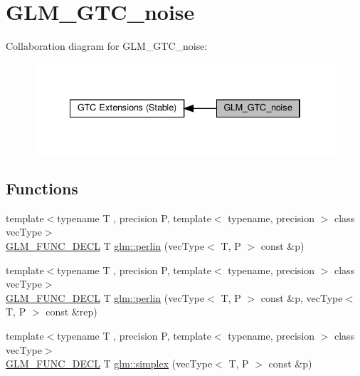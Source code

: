 \hypertarget{group__gtc__noise}{}\section{G\+L\+M\+\_\+\+G\+T\+C\+\_\+noise}
\label{group__gtc__noise}
Collaboration diagram for G\+L\+M\+\_\+\+G\+T\+C\+\_\+noise\+:\nopagebreak
\begin{figure}[H]
\begin{center}
\leavevmode
\includegraphics[width=334pt]{group__gtc__noise}
\end{center}
\end{figure}
\subsection*{Functions}
\begin{DoxyCompactItemize}
\item 
{\footnotesize template$<$typename T , precision P, template$<$ typename, precision $>$ class vec\+Type$>$ }\\\hyperlink{setup_8hpp_ab2d052de21a70539923e9bcbf6e83a51}{G\+L\+M\+\_\+\+F\+U\+N\+C\+\_\+\+D\+E\+CL} T \hyperlink{group__gtc__noise_ga14e5975486b2b36e747861d3c65b16c1}{glm\+::perlin} (vec\+Type$<$ T, P $>$ const \&p)
\item 
{\footnotesize template$<$typename T , precision P, template$<$ typename, precision $>$ class vec\+Type$>$ }\\\hyperlink{setup_8hpp_ab2d052de21a70539923e9bcbf6e83a51}{G\+L\+M\+\_\+\+F\+U\+N\+C\+\_\+\+D\+E\+CL} T \hyperlink{group__gtc__noise_ga7e103ffffacb322fe2d4863c372ae2fd}{glm\+::perlin} (vec\+Type$<$ T, P $>$ const \&p, vec\+Type$<$ T, P $>$ const \&rep)
\item 
{\footnotesize template$<$typename T , precision P, template$<$ typename, precision $>$ class vec\+Type$>$ }\\\hyperlink{setup_8hpp_ab2d052de21a70539923e9bcbf6e83a51}{G\+L\+M\+\_\+\+F\+U\+N\+C\+\_\+\+D\+E\+CL} T \hyperlink{group__gtc__noise_ga05f5ab240c9a3fdeee353636e464c285}{glm\+::simplex} (vec\+Type$<$ T, P $>$ const \&p)
\end{DoxyCompactItemize}


